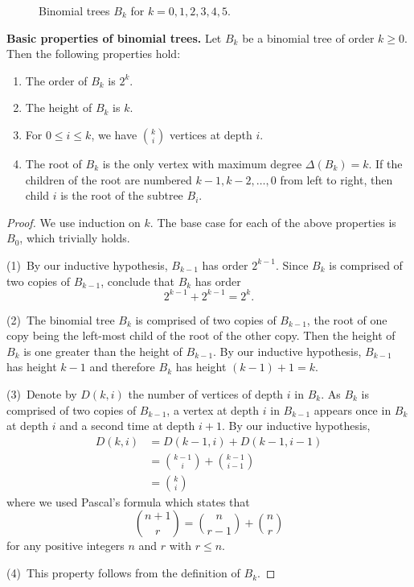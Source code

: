 \begin{figure}[!htbp]
\centering

\caption{Binomial trees $B_k$ for $k = 0, 1, 2, 3, 4, 5$.}
\label{fig:tree_data_structures:binomial_trees_k0_4}
\end{figure}

\begin{lemma}
\label{lem:tree_data_structures:basic_properties_binomial_trees}
\textbf{Basic properties of binomial trees.}
Let $B_k$ be a binomial tree of order $k \geq 0$. Then the following
properties hold:
\begin{enumerate}
\item The order of $B_k$ is $2^k$.

\item The height of $B_k$ is $k$.

\item For $0 \leq i \leq k$, we have $\binom{k}{i}$ vertices at depth
  $i$.

\item The root of $B_k$ is the only vertex with maximum degree
  $\Delta(B_k) = k$. If the children of the root are numbered
  $k - 1, k - 2, \dots, 0$ from left to right, then child $i$ is the
  root of the subtree $B_i$.
\end{enumerate}
\end{lemma}

\begin{proof}
We use induction on $k$. The base case for each of the above
properties is $B_0$, which trivially holds.

(1)~By our inductive hypothesis, $B_{k-1}$ has order $2^{k-1}$. Since
$B_k$ is comprised of two copies of $B_{k-1}$, conclude that $B_k$ has
order
\[
2^{k-1} + 2^{k-1}
=
2^k.
\]

(2)~The binomial tree $B_k$ is comprised of two copies of $B_{k-1}$,
the root of one copy being the left-most child of the root of the
other copy. Then the height of $B_k$ is one greater than the height of
$B_{k-1}$. By our inductive hypothesis, $B_{k-1}$ has height $k - 1$
and therefore $B_k$ has height $(k - 1) + 1 = k$.

(3)~Denote by $D(k,i)$ the number of vertices of depth $i$ in
$B_k$. As $B_k$ is comprised of two copies of $B_{k-1}$, a vertex at
depth $i$ in $B_{k-1}$ appears once in $B_k$ at depth $i$ and a second
time at depth $i + 1$. By our inductive hypothesis,
\begin{align*}
D(k,i)
&=
D(k-1, i) + D(k-1, i-1) \\[4pt]
&=
\binom{k-1}{i} + \binom{k-1}{i-1} \\[4pt]
&=
\binom{k}{i}
\end{align*}
where we used Pascal's formula which states that
\[
\binom{n+1}{r}
=
\binom{n}{r-1} + \binom{n}{r}
\]
for any positive integers $n$ and $r$ with $r \leq n$.

(4)~This property follows from the definition of $B_k$.
\end{proof}

